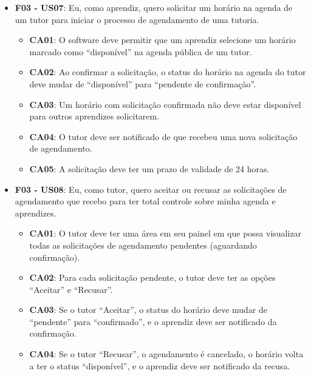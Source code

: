 \begin{itemize}
\begin{itemize}
\end{itemize}

\item \textbf{F03 - US07}: Eu, como aprendiz, quero solicitar um horário na agenda de um tutor para iniciar o processo de agendamento de uma tutoria.

\begin{itemize}

\item \textbf{CA01}: O software deve permitir que um aprendiz selecione um horário marcado como ``disponível'' na agenda pública de um tutor.

\item \textbf{CA02}: Ao confirmar a solicitação, o status do horário na agenda do tutor deve mudar de ``disponível'' para ``pendente de confirmação''.

\item \textbf{CA03}: Um horário com solicitação confirmada não deve estar disponível para outros aprendizes solicitarem.

\item \textbf{CA04}: O tutor deve ser notificado de que recebeu uma nova solicitação de agendamento.

\item \textbf{CA05}: A solicitação deve ter um prazo de validade de 24 horas.

\end{itemize}

\item \textbf{F03 - US08}: Eu, como tutor, quero aceitar ou recusar as solicitações de agendamento que recebo para ter total controle sobre minha agenda e aprendizes.

\begin{itemize}

\item \textbf{CA01}: O tutor deve ter uma área em seu painel em que possa visualizar todas as solicitações de agendamento pendentes (aguardando confirmação).

\item \textbf{CA02}: Para cada solicitação pendente, o tutor deve ter as opções ``Aceitar'' e ``Recusar''.

\item \textbf{CA03}: Se o tutor ``Aceitar'', o status do horário deve mudar de ``pendente'' para ``confirmado'', e o aprendiz deve ser notificado da confirmação.

\item \textbf{CA04}: Se o tutor ``Recusar'', o agendamento é cancelado, o horário volta a ter o status ``disponível'', e o aprendiz deve ser notificado da recusa.


\end{itemize}
\end{itemize}
